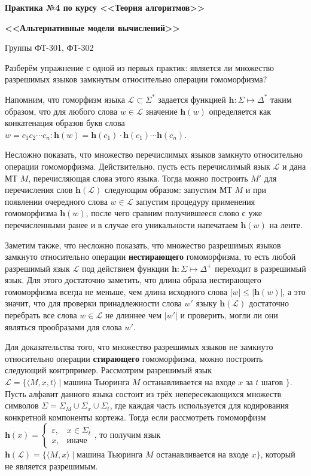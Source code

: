 \documentclass[
    11pt,
    a4paper
]{article}
\theoremstyle{definition}
\begin{document}
\centerline{\Large \bf Практика №4 по курсу <<Теория алгоритмов>>}
\centerline{\Large \bf <<Альтернативные модели вычислений>>}
\centerline{Группы ФТ-301, ФТ-302}

Разберём упражнение с одной из первых практик: является ли множество разрешимых языков замкнутым относительно операции гомоморфизма?

Напомним, что гоморфизм языка $\mathcal{L} \subset \Sigma^*$ задается функцией $\mathbf{h}: \Sigma \mapsto \Delta^*$ таким образом, что для любого слова $w \in \mathcal{L}$ значение $\mathbf{h}(w)$ определяется как конкатенация образов букв слова $w = c_1 c_2 \cdots c_n: \mathbf{h}(w) = \mathbf{h}(c_1) \cdot \mathbf{h}(c_1) \cdots \mathbf{h}(c_n)$.

Несложно показать, что множество перечислимых языков замкнуто относительно операции гомоморфизма. Действительно, пусть есть перечислимый язык $\mathcal{L}$ и дана МТ $M$, перечисляющая слова этого языка. Тогда можно построить $M'$ для перечисления слов $\mathbf{h}(\mathcal{L})$ следующим образом: запустим МТ $M$ и при появлении очередного слова $w \in \mathcal{L}$ запустим процедуру применения гомоморфизма $\mathbf{h}(w)$, после чего сравним получившееся слово с уже перечисленными ранее и в случае его уникальности напечатаем $\mathbf{h}(w)$ на ленте.

Заметим также, что несложно показать, что множество разрешимых языков замкнуто относительно операции \textbf{нестирающего} гомоморфизма, то есть любой разрешимый язык $\mathcal{L}$ под действием функции $\mathbf{h}: \Sigma \mapsto \Delta^+$ переходит в разрешимый язык. Для этого достаточно заметить, что длина образа нестирающего гомоморфизма всегда не меньше, чем длина исходного слова $|w| \leq |\mathbf{h}(w)|$, а это значит, что для проверки принадлежности слова $w'$ языку $\mathbf{h}(\mathcal{L})$ достаточно перебрать все слова $w \in \mathcal{L}$ не длиннее чем $|w'|$ и проверить, могли ли они являться прообразами для слова $w'$.

Для доказательства того, что множество разрешимых языков не замкнуто относительно операции \textbf{стирающего} гомоморфизма, можно построить следующий контрпример. Рассмотрим разрешимый язык $\mathcal{L} = \{ \langle M, x, t \rangle \mid \text{машина Тьюринга } M \text{ останавливается на входе } x \text{ за } t \text{ шагов } \}$. Пусть алфавит данного языка состоит из трёх непересекающихся множеств символов $\Sigma = \Sigma_{M} \cup \Sigma_{x} \cup \Sigma_{t}$, где каждая часть используется для кодирования конкретной компоненты кортежа. Тогда если рассмотреть гомоморфизм $\mathbf{h}(x) = \begin{cases}\varepsilon, & x \in \Sigma_{t} \\ x, & \text{иначе}\end{cases}$, то получим язык $\mathbf{h}(\mathcal{L}) = \{ \langle M, x \rangle \mid \text{машина Тьюринга } M \text{ останавливается на входе } x \}$, который не является разрешимым.
\end{document}
